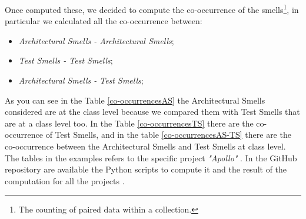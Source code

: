 Once computed these, we decided to compute the co-occurrence of the smells\footnote{The counting of paired data within a collection.}, in particular we calculated all the co-occurrence between:
\begin{itemize}
  \item \textit{Architectural Smells - Architectural Smells};
  \item \textit{Test Smells - Test Smells};
  \item \textit{Architectural Smells - Test Smells};
\end{itemize}
As you can see in the Table \ref{co-occurrencesAS} the Architectural Smells considered are at the class level because we compared them with Test Smells that are at a class level too.
In the Table \ref{co-occurrencesTS} there are the co-occurrence of Test Smells, and in the table \ref{co-occurrencesAS-TS} there are the co-occurrence between the Architectural Smells and Test Smells at class level.
The tables in the examples refers to the specific project \textit{"Apollo"} \cite{IEEEhowto:apollo}. 
In the GitHub repository are available the Python scripts to compute it and the result of the computation for all the projects \cite{IEEEhowto:co-occurrence}.

\begin{table}[!ht]
\centering
\caption{Co-occurrences Architectural Smell - Architectural Smell in \emph{Apollo} project.}\label{co-occurrencesAS}
\end{table}

\begin{table}[!ht]
\caption{Co-occurrences Test Smell - Test Smell in \emph{Apollo} project.}\label{co-occurrencesTS}
\end{table}

